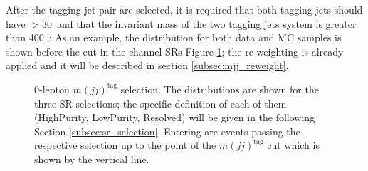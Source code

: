 After the tagging jet pair are selected, it is required that both tagging jets should have \pT$>$30~\GeV and that the invariant mass of the two tagging jets system is greater than 400~\GeV; 
As an example, the \mjjtag distribution for both data and MC samples is shown before the cut in the \zlep channel SRs Figure \ref{fig:0lepMjj}; 
the \mjjtag re-weighting is already applied and it will be described in section \ref{subsec:mjj_reweight}.

\begin{figure}[ht]
    \centering
    \caption{0-lepton $m(jj)^\text{tag}$ selection. The distributions are shown for the three SR selections; the specific definition of each of them (HighPurity, LowPurity, Resolved) will be given in the following Section \ref{subsec:sr_selection}. Entering are events passing the respective selection up to the point of the $m(jj)^\text{tag}$ cut which is shown by the vertical line.} 
    \label{fig:0lepMjj}
\end{figure}



